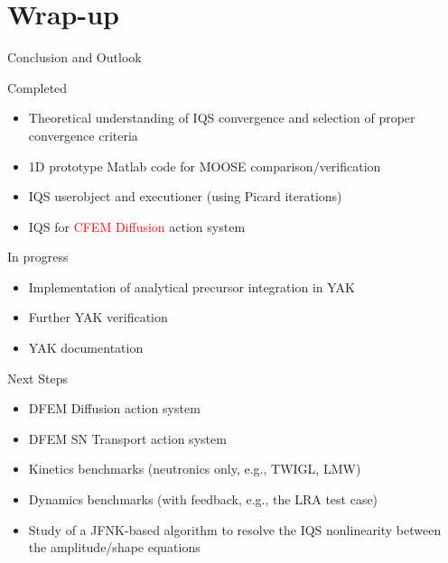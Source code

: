 \documentclass[8pt]{beamer}
\newcommand{\bi}{\begin{itemize}}
\newcommand{\ei}{\end{itemize}}
\newcommand{\tcr}[1]{\textcolor{red}{#1}}
\begin{document}
%
%


%


\section{Wrap-up}

\begin{frame}{Conclusion and Outlook}

\begin{block}{Completed}
\bi
\item Theoretical understanding of IQS convergence and selection of proper convergence criteria
\item 1D prototype Matlab code for MOOSE comparison/verification
\item IQS userobject and executioner (using Picard iterations)
\item IQS for \tcr{CFEM Diffusion} action system
\ei
\end{block}

\begin{block}{In progress}
\bi
\item Implementation of analytical precursor integration in YAK
\item Further YAK verification
\item YAK documentation
\ei
\end{block}
\begin{block}{Next Steps}
\bi
\item DFEM Diffusion action system
\item DFEM SN Transport action system
\item Kinetics benchmarks (neutronics only, e.g., TWIGL, LMW)
\item Dynamics benchmarks (with feedback, e.g., the LRA test case)
\item Study of a JFNK-based algorithm to resolve the IQS nonlinearity between the amplitude/shape equations
\ei
\end{block}

\end{frame}
\end{document}
